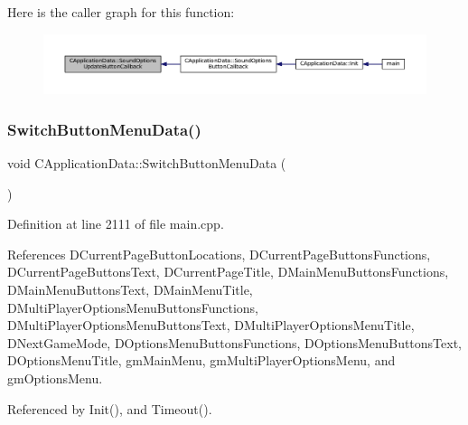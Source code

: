 Here is the caller graph for this function\+:\nopagebreak
\begin{figure}[H]
\begin{center}
\leavevmode
\includegraphics[width=350pt]{classCApplicationData_ae63c8ca19ddeb92a3aaf0a5d67d09e58_icgraph}
\end{center}
\end{figure}
\hypertarget{classCApplicationData_a2a464fd480c791ab13a1b1ca855e4578}{}\label{classCApplicationData_a2a464fd480c791ab13a1b1ca855e4578} 
\subsubsection{\texorpdfstring{Switch\+Button\+Menu\+Data()}{SwitchButtonMenuData()}}
{\footnotesize\ttfamily void C\+Application\+Data\+::\+Switch\+Button\+Menu\+Data (\begin{DoxyParamCaption}{ }\end{DoxyParamCaption})\hspace{0.3cm}{\ttfamily [protected]}}



Definition at line 2111 of file main.\+cpp.



References D\+Current\+Page\+Button\+Locations, D\+Current\+Page\+Buttons\+Functions, D\+Current\+Page\+Buttons\+Text, D\+Current\+Page\+Title, D\+Main\+Menu\+Buttons\+Functions, D\+Main\+Menu\+Buttons\+Text, D\+Main\+Menu\+Title, D\+Multi\+Player\+Options\+Menu\+Buttons\+Functions, D\+Multi\+Player\+Options\+Menu\+Buttons\+Text, D\+Multi\+Player\+Options\+Menu\+Title, D\+Next\+Game\+Mode, D\+Options\+Menu\+Buttons\+Functions, D\+Options\+Menu\+Buttons\+Text, D\+Options\+Menu\+Title, gm\+Main\+Menu, gm\+Multi\+Player\+Options\+Menu, and gm\+Options\+Menu.



Referenced by Init(), and Timeout().


